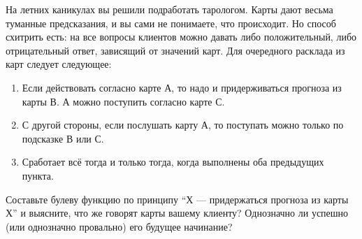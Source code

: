 \question
На летних каникулах вы решили подработать тарологом. Карты дают весьма туманные предсказания, и вы сами не понимаете, что происходит. Но способ схитрить есть: на все вопросы клиентов можно давать либо положительный, либо отрицательный ответ, зависящий от значений карт. Для очередного расклада из карт следует следующее:

\begin{enumerate}
    \item  Если действовать согласно карте А, то надо и придерживаться прогноза из карты В. А можно поступить согласно карте С.
    \item С другой стороны, если послушать карту А, то поступать можно только по подсказке В или С.
    \item Сработает всё тогда и только тогда, когда выполнены оба предыдущих пункта.
\end{enumerate}

Составьте булеву функцию по принципу “Х — придержаться прогноза из карты Х” и выясните, что же говорят карты вашему клиенту? Однозначно ли успешно (или однозначно провально) его будущее начинание?
